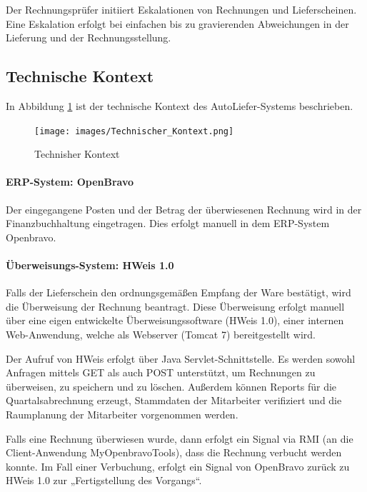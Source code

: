Der Rechnungsprüfer initiiert Eskalationen von Rechnungen und Lieferscheinen. Eine Eskalation erfolgt bei einfachen bis zu gravierenden Abweichungen in der Lieferung und der Rechnungsstellung.

\subsection{Technische Kontext}

In Abbildung \ref{fig:Technischer_Kontext} ist der technische Kontext des AutoLiefer-Systems beschrieben.

\begin{figure}
  \centering
  \texttt{[image: images/Technischer\_Kontext.png]}
  \caption{Technisher Kontext}
  \label{fig:Technischer_Kontext}
\end{figure}

\paragraph{ERP-System: OpenBravo}

Der eingegangene Posten und der Betrag der überwiesenen Rechnung wird in der Finanzbuchhaltung eingetragen. Dies erfolgt manuell in dem ERP-System Openbravo. %

\paragraph{Überweisungs-System: HWeis 1.0}

Falls der Lieferschein den ordnungsgemäßen Empfang der Ware bestätigt, wird die Überweisung der Rechnung beantragt. Diese Überweisung erfolgt manuell über eine eigen entwickelte Überweisungssoftware (HWeis 1.0), einer internen Web-Anwendung, welche als Webserver (Tomcat 7) bereitgestellt wird.

Der Aufruf von HWeis erfolgt über Java Servlet-Schnittstelle. Es werden sowohl Anfragen mittels GET als auch POST unterstützt, um Rechnungen zu überweisen, zu speichern und zu löschen. Außerdem können Reports für die Quartalsabrechnung erzeugt, Stammdaten der Mitarbeiter verifiziert und die Raumplanung der Mitarbeiter vorgenommen werden.

Falls eine Rechnung überwiesen wurde, dann erfolgt ein Signal via RMI (an die Client-Anwendung MyOpenbravoTools), dass die Rechnung verbucht werden konnte. Im Fall einer Verbuchung, erfolgt ein Signal von OpenBravo zurück zu HWeis 1.0 zur „Fertigstellung des Vorgangs“.

